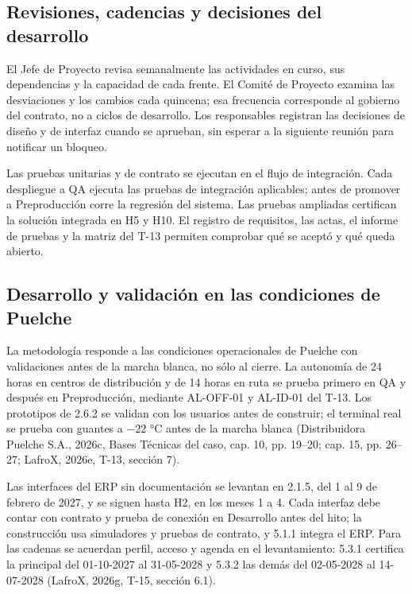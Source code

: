 \subsection{Revisiones, cadencias y decisiones del desarrollo}

El Jefe de Proyecto revisa semanalmente las actividades en curso, sus dependencias y la capacidad de cada frente. El Comité de Proyecto examina las desviaciones y los cambios cada quincena; esa frecuencia corresponde al gobierno del contrato, no a ciclos de desarrollo. Los responsables registran las decisiones de diseño y de interfaz cuando se aprueban, sin esperar a la siguiente reunión para notificar un bloqueo.

Las pruebas unitarias y de contrato se ejecutan en el flujo de integración. Cada despliegue a QA ejecuta las pruebas de integración aplicables; antes de promover a Preproducción corre la regresión del sistema. Las pruebas ampliadas certifican la solución integrada en H5 y H10. El registro de requisitos, las actas, el informe de pruebas y la matriz del T-13 permiten comprobar qué se aceptó y qué queda abierto.

\subsection{Desarrollo y validación en las condiciones de Puelche}

La metodología responde a las condiciones operacionales de Puelche con validaciones antes de la marcha blanca, no sólo al cierre. La autonomía de 24 horas en centros de distribución y de 14 horas en ruta se prueba primero en QA y después en Preproducción, mediante AL-OFF-01 y AL-ID-01 del T-13. Los prototipos de 2.6.2 se validan con los usuarios antes de construir; el terminal real se prueba con guantes a −22 °C antes de la marcha blanca (Distribuidora Puelche S.A., 2026c, Bases Técnicas del caso, cap. 10, pp. 19--20; cap. 15, pp. 26--27; LafroX, 2026e, T-13, sección 7).

Las interfaces del ERP sin documentación se levantan en 2.1.5, del 1 al 9 de febrero de 2027, y se siguen hasta H2, en los meses 1 a 4. Cada interfaz debe contar con contrato y prueba de conexión en Desarrollo antes del hito; la construcción usa simuladores y pruebas de contrato, y 5.1.1 integra el ERP. Para las cadenas se acuerdan perfil, acceso y agenda en el levantamiento: 5.3.1 certifica la principal del 01-10-2027 al 31-05-2028 y 5.3.2 las demás del 02-05-2028 al 14-07-2028 (LafroX, 2026g, T-15, sección 6.1).

